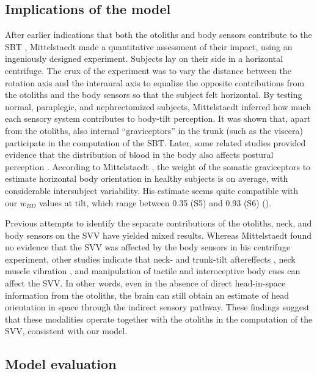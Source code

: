 \subsection{Implications of the model}
 
After earlier indications that both the otoliths and body sensors contribute to the SBT \cite{clark1963, clark1964, nelson1968}, Mittelstaedt \citeyear{mittelstaedt1997} made a quantitative assessment of their impact, using an ingeniously designed experiment. Subjects lay on their side in a horizontal centrifuge. The crux of the experiment was to vary the distance between the rotation axis and the interaural axis to equalize the opposite contributions from the otoliths and the body sensors so that the subject felt horizontal. By testing normal, paraplegic, and nephrectomized subjects, Mittelstaedt inferred how much each sensory system contributes to body-tilt perception. It was shown that, apart from the otoliths, also internal ``graviceptors'' in the trunk (such as the viscera) participate in the computation of the SBT. Later, some related studies provided evidence that the distribution of blood in the body also affects postural perception \cite{vaitl1997, vaitl2002}. According to Mittelstaedt \citeyear{mittelstaedt1998}, the weight of the somatic graviceptors to estimate horizontal body orientation in healthy subjects is  on average, with considerable intersubject variability. His estimate seems quite compatible with our $w_{BD}$ values at  tilt, which range between 0.35 (S5) and 0.93 (S6) (). 

Previous attempts to identify the separate contributions of the otoliths, neck, and body sensors on the SVV have yielded mixed results. Whereas Mittelstaedt \citeyear{mittelstaedt1998} found no evidence that the SVV was affected by the body sensors in his centrifuge experiment, other studies indicate that neck- and trunk-tilt aftereffects \cite{wade1968}, neck muscle vibration \cite{mckenna2004}, and manipulation of tactile and interoceptive body cues \cite{trousselard2004} can affect the SVV. In other words, even in the absence of direct head-in-space information from the otoliths, the brain can still obtain an estimate of head orientation in space through the indirect sensory pathway. These findings suggest that these modalities operate together with the otoliths in the computation of the SVV, consistent with our model. 


\subsection{Model evaluation}
 
